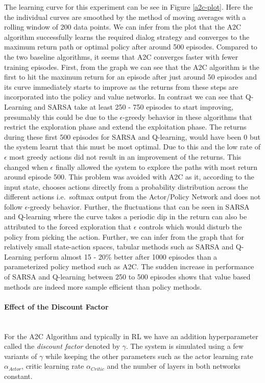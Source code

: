 \documentclass[14pt]{extarticle}
\newcommand{\myparagraph}[1]{\paragraph{#1}\mbox{}\\ \linebreak}
\numberwithin{equation}{section}
\begin{document}
	The learning curve for this experiment can be see in Figure \ref{a2c-plot}. Here the the individual curves are smoothed by the method of moving averages with a rolling window of 200 data points. We can infer from the plot that the A2C algorithm successfully learns the required dialog strategy and converges to the maximum return path or optimal policy after around 500 episodes. Compared to the two baseline algorithms, it seems that A2C converges faster with fewer training episodes. 
	First, from the graph we can see that the A2C algorithm is the first to hit the maximum return for an episode after just around 50 episodes and its curve immediately starts to improve as the returns from these steps are incorporated into the policy and value networks. In contrast we can see that Q-Learning and SARSA take at least 250 - 750 episodes to start improving, presumably this could be due to the $\epsilon$-greedy behavior in these algorithms that restrict the exploration phase and extend the exploitation phase. The returns during these first 500 episodes for SARSA and Q-learning, would have been 0 but the system learnt that this must be most optimal. Due to this and the low rate of $\epsilon$ most greedy actions did not result in an improvement of the returns. This changed when $\epsilon$ finally allowed the system to explore the paths with most return around episode 500. This problem was avoided with A2C as it, according to the input state, chooses actions directly from a probability distribution across the different actions i.e.\ softmax output from the Actor/Policy Network and does not follow $\epsilon$-greedy behavior. Further, the fluctuations that can be seen in SARSA and Q-learning where the curve takes a periodic dip in the return can also be attributed to the forced exploration that $\epsilon$ controls which would disturb the policy from picking the action. Further, we can infer from the graph that for relatively small state-action spaces, tabular methods such as SARSA and Q-Learning perform almost 15 - 20\% better after 1000 episodes than a parameterized policy method such as A2C. The sudden increase in performance of SARSA and Q-learning between 250 to 500 episodes shows that value based methods are indeed more sample efficient than policy methods.
	\myparagraph{Effect of the Discount Factor}\label{a2c_df_effect}
	For the A2C Algorithm and typically in RL we have an addition hyperparameter called the \textit{discount factor} denoted by $\gamma$. The system is simulated using a few variants of $\gamma$ while keeping the other parameters such as the actor learning rate $\alpha_{Actor}$, critic learning rate $\alpha_{Critic}$ and the number of layers in both networks constant. 
\end{document}
